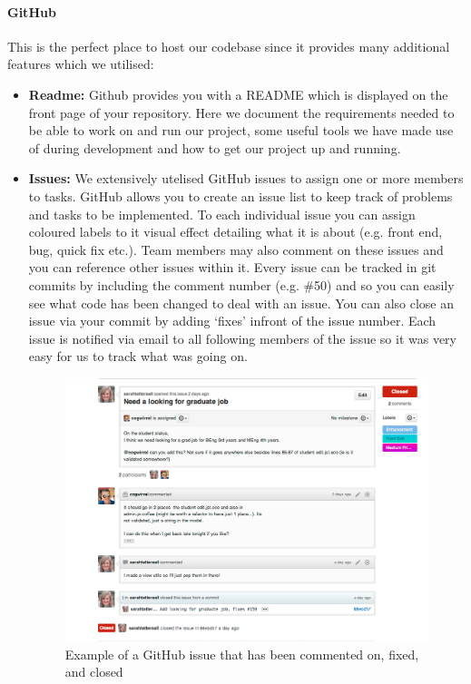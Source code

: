     \paragraph{GitHub\cite{github}} This is the perfect place to host our codebase since it provides many additional features which we utilised:
    \begin{itemize}
        \item \textbf{Readme:} Github provides you with a README which is displayed on the front page of your repository. Here we document the requirements needed to be able to work on and run our project, some useful tools we have made use of during development and how to get our project up and running.
        \item \textbf{Issues:} We extensively utelised GitHub issues to assign one or more members to tasks. GitHub allows you to create an issue list to keep track of problems and tasks to be implemented. To each individual issue you can assign coloured labels to it visual effect detailing what it is about (e.g. front end, bug, quick fix etc.). Team members may also comment on these issues and you can reference other issues within it. Every issue can be tracked in git commits by including the comment number (e.g. \#50) and so you can easily see what code has been changed to deal with an issue. You can also close an issue via your commit by adding `fixes' infront of the issue number. Each issue is notified via email to all following members of the issue so it was very easy for us to track what was going on. 

        \begin{figure}[H]\centering
        \includegraphics[scale=0.3]{images/project_management/team_management/graduate_issue}
        \caption{Example of a GitHub issue that has been commented on, fixed, and closed}


\end{figure}
\end{itemize}

